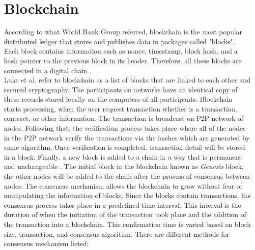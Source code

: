 \section{Blockchain} According to what World Bank Group \cite{Natarajan} referred, blockchain is the most popular distributed ledger that stores and publishes data in packages called "blocks". Each block contains information such as nonce, timestamp, block hash, and a hash pointer to the previous block in its header. Therefore, all these blocks are connected in a digital chain \cite{Natarajan}. \\
Luke et al. \cite{Luke} refer to blockchain as a list of blocks that are linked to each other and secured cryptography. The participants on networks have an identical copy of these records stored locally on the computers of all participants. Blockchain starts processing, when the user request transaction whether is a transaction, contract, or other information. The transaction is broadcast on P2P network of nodes. Following that, the verification process takes place where all of the nodes in the P2P network verify the transactions via the hashes which are generated by some algorithm. Once verification is completed, transaction detail will be stored in a block. Finally, a new block is added to a chain in a way that is permanent and unchangeable \cite{Luke}. The initial block in the blockchain known as \textit{Genesis} block, the other nodes will be added to the chain after the process of consensus between nodes. The consensus mechanism allows the blockchain to grow without fear of manipulating the information of blocks. Since the blocks contain transactions, the consensus process takes place in a predefined time interval. This interval is the duration of when the initiation of the transaction took place and the addition of the transaction into a blockchain. This confirmation time is varied based on block size, transaction, and consensus algorithm. There are different methods for consensus mechanism listed: 
